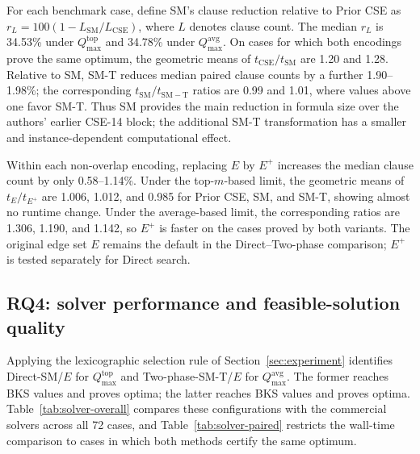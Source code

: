 \documentclass[]{interact}
\theoremstyle{plain}
\theoremstyle{definition}
\theoremstyle{remark}
\begin{document}


\begin{samepage}
For each benchmark case, define SM's clause reduction relative to Prior CSE as $r_L=100(1-L_{\mathrm{SM}}/L_{\mathrm{CSE}})$, where $L$ denotes clause count. The median $r_L$ is 34.53\% under $Q_{\max}^{\mathrm{top}}$ and 34.78\% under $Q_{\max}^{\mathrm{avg}}$. On cases for which both encodings prove the same optimum, the geometric means of $t_{\mathrm{CSE}}/t_{\mathrm{SM}}$ are 1.20 and 1.28. Relative to SM, SM-T reduces median paired clause counts by a further 1.90--1.98\%; the corresponding $t_{\mathrm{SM}}/t_{\mathrm{SM-T}}$ ratios are 0.99 and 1.01, where values above one favor SM-T. Thus SM provides the main reduction in formula size over the authors' earlier CSE-14 block; the additional SM-T transformation has a smaller and instance-dependent computational effect.
\end{samepage}

Within each non-overlap encoding, replacing $E$ by $E^+$ increases the median clause count by only 0.58--1.14\%. Under the top-$m$-based limit, the geometric means of $t_E/t_{E^+}$ are 1.006, 1.012, and 0.985 for Prior CSE, SM, and SM-T, showing almost no runtime change. Under the average-based limit, the corresponding ratios are 1.306, 1.190, and 1.142, so $E^+$ is faster on the cases proved by both variants. The original edge set $E$ remains the default in the Direct--Two-phase comparison; $E^+$ is tested separately for Direct search.

\FloatBarrier
\subsection{RQ4: solver performance and feasible-solution quality}

Applying the lexicographic selection rule of Section~\ref{sec:experiment} identifies Direct-SM/$E$ for $Q_{\max}^{\mathrm{top}}$ and Two-phase-SM-T/$E$ for $Q_{\max}^{\mathrm{avg}}$. The former reaches \SelectedTopBKSCount{} BKS values and proves \SelectedTopOptCount{} optima; the latter reaches \SelectedAVGBKSCount{} BKS values and proves \SelectedAVGOptCount{} optima. Table~\ref{tab:solver-overall} compares these configurations with the commercial solvers across all 72 cases, and Table~\ref{tab:solver-paired} restricts the wall-time comparison to cases in which both methods certify the same optimum.


\end{document}
